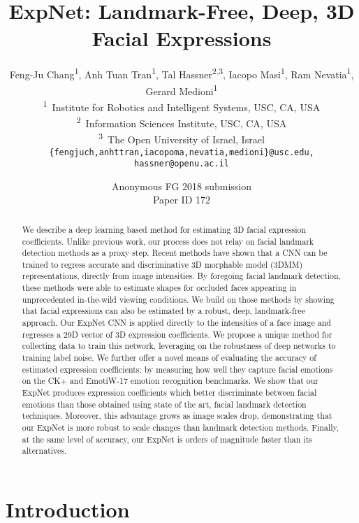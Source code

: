 \documentclass[a4paper, 10pt, conference]{ieeeconf}
\title{\LARGE \bf
ExpNet: Landmark-Free, Deep, 3D Facial Expressions
}
\author{Feng-Ju Chang\textsuperscript{1}, Anh Tuan Tran\textsuperscript{1}, Tal Hassner\textsuperscript{2,3}, Iacopo Masi\textsuperscript{1}, Ram Nevatia\textsuperscript{1}, Gerard Medioni\textsuperscript{1}\\
\textsuperscript{1}~Institute for Robotics and Intelligent Systems, USC, CA, USA\\
\textsuperscript{2}~Information Sciences Institute, USC, CA, USA\\
\textsuperscript{3}~The Open University of Israel, Israel\\
{\tt\small \{fengjuch,anhttran,iacopoma,nevatia,medioni\}@usc.edu, hassner@openu.ac.il}
}
\def\FGPaperID{172}
\begin{document}
\IEEEoverridecommandlockouts{}


\ifFGfinal
\thispagestyle{empty}
\pagestyle{empty}
\else
\author{Anonymous FG 2018 submission\\ Paper ID \FGPaperID \\}
\pagestyle{plain}
\fi
\maketitle

\begin{abstract}
We describe a deep learning based method for estimating 3D facial expression coefficients. Unlike previous work, our process does not relay on facial landmark detection methods as a proxy step. Recent methods have shown that a CNN can be trained to regress accurate and discriminative 3D morphable model (3DMM) representations, directly from image intensities. By foregoing facial landmark detection, these methods were able to estimate shapes for occluded faces appearing in unprecedented in-the-wild viewing conditions. We build on those methods by showing that facial expressions can also be estimated by a robust, deep, landmark-free approach. Our ExpNet CNN is applied directly to the intensities of a face image and regresses a 29D vector of 3D expression coefficients. We propose a unique method for collecting data to train this network, leveraging on the robustness of deep networks to training label noise. We further offer a novel means of evaluating the accuracy of estimated expression coefficients: by measuring how well they capture facial emotions on the CK+ and EmotiW-17 emotion recognition benchmarks. We show that our ExpNet produces expression coefficients which better discriminate between facial emotions than those obtained using state of the art, facial landmark detection techniques. Moreover, this advantage grows as image scales drop, demonstrating that our ExpNet is more robust to scale changes than landmark detection methods. Finally, at the same level of accuracy, our ExpNet is orders of magnitude faster than its alternatives.
\end{abstract}


\section{Introduction}\label{sec:intro}
\end{document}
